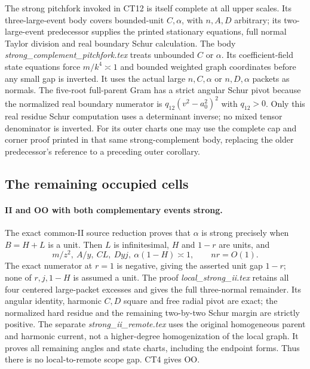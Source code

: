 The strong pitchfork invoked in CT12 is itself complete at all
upper scales.  Its three-large-event body covers bounded-unit
\(C,\alpha\), with \(n,A,D\) arbitrary; its two-large-event
predecessor supplies the printed stationary equations, full
normal Taylor division and real boundary Schur calculation.
The body \emph{strong\_complement\_pitchfork.tex} treats
unbounded \(C\) or \(\alpha\).  Its coefficient-field state
equations force \(m/k^4\asymp1\) and bounded weighted graph
coordinates before any small gap is inverted.  It uses the
actual large \(n,C,\alpha\) or \(n,D,\alpha\) packets as normals.
The five-root full-parent Gram has a strict angular Schur pivot
because the normalized real boundary numerator is
\(q_{12}(v^2-a_0^2)^2\) with \(q_{12}>0\).
Only this real residue Schur computation uses a determinant
inverse; no mixed tensor denominator is inverted.
For its outer charts one may use the complete cap and corner
proof printed in that same strong-complement body, replacing
the older predecessor's reference to a preceding outer corollary.

\subsection{The remaining occupied cells}

\paragraph{II and OO with both complementary events strong.}
The exact common-II source reduction proves that
\(\alpha\) is strong precisely when \(B=H+L\) is a unit.
Then \(L\) is infinitesimal, \(H\) and \(1-r\) are units, and
\[
 m/z^2,\ A/y,\ CL,\ Dyj,\ \alpha(1-H)\asymp1,
 \qquad nr=O(1).                                      \tag{CT14}
\]
The exact numerator at \(r=1\) is negative, giving the asserted
unit gap \(1-r\); none of \(r,j,1-H\) is assumed a unit.
The proof \emph{local\_strong\_ii.tex} retains all four centered
large-packet excesses and gives the full three-normal remainder.
Its angular identity, harmonic \(C,D\) square and free radial
pivot are exact; the normalized hard residue and the remaining
two-by-two Schur margin are strictly positive.
The separate \emph{strong\_ii\_remote.tex} uses the original
homogeneous parent and harmonic current, not a higher-degree
homogenization of the local graph.  It proves all remaining
angles and state charts, including the endpoint forms.
Thus there is no local-to-remote scope gap.  CT4 gives OO.

